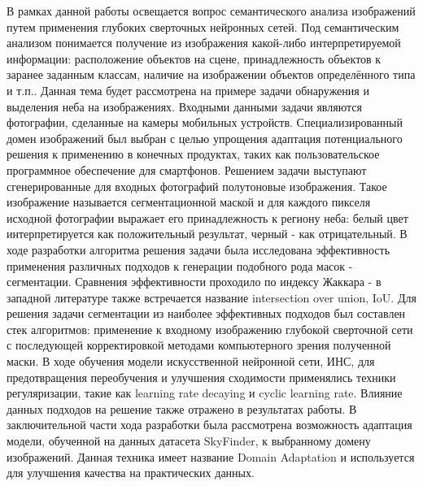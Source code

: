 \usepackage{amsmath}
\usepackage{cleveref}







\Intro

В рамках данной работы освещается вопрос семантического анализа изображений путем применения глубоких сверточных нейронных сетей.
Под семантическим анализом понимается получение из изображения какой-либо интерпретируемой информации: расположение объектов на сцене,
принадлежность объектов к заранее заданным классам, наличие на изображении объектов определённого типа и т.п..
Данная тема будет рассмотрена на примере задачи обнаружения и выделения неба на изображениях.
Входными данными задачи являются фотографии, сделанные на камеры мобильных устройств.
Специализированный домен изображений был выбран с целью упрощения адаптация потенциального решения к применению в конечных продуктах,
таких как пользовательское программное обеспечение для смартфонов.
Решением задачи выступают сгенерированные для входных фотографий полутоновые изображения.
Такое изображение называется сегментационной маской и для каждого пикселя исходной фотографии выражает его принадлежность
к региону неба: белый цвет интерпретируется как положительный результат, черный - как отрицательный.
В ходе разработки алгоритма решения задачи была исследована эффективность применения различных подходов к генерации подобного рода масок - сегментации.
Сравнения эффективности проходило по индексу Жаккара - в западной литературе также встречается название intersection over union, IoU\@.
Для решения задачи сегментации из наиболее эффективных подходов был составлен стек алгоритмов: применение к входному изображению глубокой сверточной сети
с последующей корректировкой методами компьютерного зрения полученной маски.
В ходе обучения модели искусственной нейронной сети, ИНС, для предотвращения переобучения и улучшения сходимости
применялись техники регуляризации, такие как learning rate decaying и cyclic learning rate.
Влияние данных подходов на решение также отражено в результатах работы.
В заключительной части хода разработки была рассмотрена возможность адаптация модели, обученной на данных датасета SkyFinder,
к выбранному домену изображений.
Данная техника имеет название Domain Adaptation и используется для улучшения качества на практических данных.

